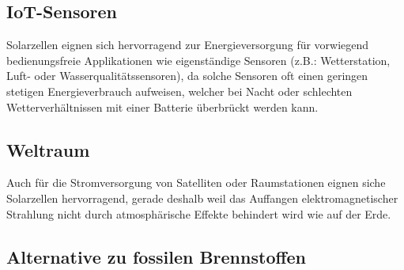 \subsection{IoT-Sensoren}
    Solarzellen eignen sich hervorragend zur Energieversorgung für
    vorwiegend bedienungsfreie Applikationen wie eigenständige Sensoren
    (z.B.: Wetterstation, Luft- oder Wasserqualitätssensoren), da solche
    Sensoren oft einen geringen stetigen Energieverbrauch aufweisen,
    welcher bei Nacht oder schlechten Wetterverhältnissen mit einer
    Batterie überbrückt werden kann.
\subsection{Weltraum}
    Auch für die Stromversorgung von Satelliten oder Raumstationen eignen
    siche Solarzellen hervorragend, gerade deshalb weil das Auffangen
    elektromagnetischer Strahlung nicht durch atmosphärische Effekte
    behindert wird wie auf der Erde.
\subsection{Alternative zu fossilen Brennstoffen}

